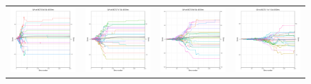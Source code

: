 \begin{figure}
\begin{tabular}{cccc}
\hspace{-0.5cm}\includegraphics[width = 1.55in]{images/Visualizations/GAvsMCTS/4000ms5x5.png} &
\hspace{-0.5cm}\includegraphics[width = 1.55in]{images/Visualizations/GAvsMCTS/4000ms7x7.png} &
\hspace{-0.5cm}\includegraphics[width = 1.55in]{images/Visualizations/GAvsMCTS/4000ms9x9.png} &
\hspace{-0.5cm}\includegraphics[width = 1.55in]{images/Visualizations/GAvsMCTS/4000ms11x11.png} \\


\end{tabular}
\end{figure}

